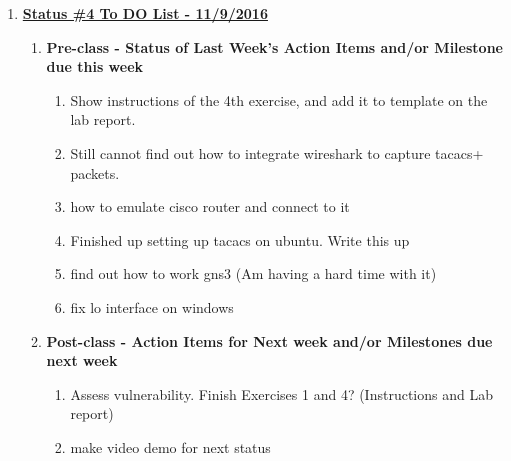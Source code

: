 \documentclass[main.tex]{subfiles}
\begin{document}
\hfill \break
\begin{enumerate}[leftmargin=12mm,labelsep=0.1cm]
    \item[] \textbf{\Large \underline{Status \#4 To DO List - 11/9/2016}}
    \begin{enumerate}
        \item \textbf{Pre-class - Status of Last Week's Action Items and/or Milestone due this week}
        \begin{enumerate}
            \item Show instructions of the 4th exercise, and add it to template on the lab report.
            \item Still cannot find out how to integrate wireshark to capture tacacs+ packets.
            \item how to emulate cisco router and connect to it
            \item Finished up setting up tacacs on ubuntu. Write this up
            \item find out how to work gns3 (Am having a hard time with it)
            \item fix lo interface on windows
        \end{enumerate}
        \item \textbf{Post-class - Action Items for Next week and/or Milestones due next week}
        \begin{enumerate}
            \item Assess vulnerability. Finish Exercises 1 and 4? (Instructions and Lab report)
            \item make video demo for next status
        \end{enumerate}
    \end{enumerate}
\end{enumerate}
\hfill \break
\end{document}

